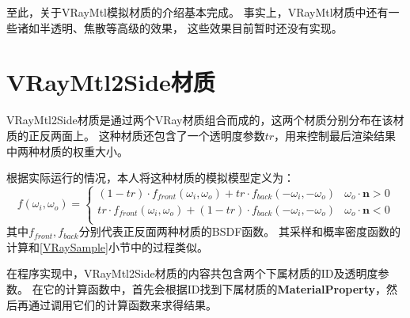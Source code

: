 至此，关于VRayMtl模拟材质的介绍基本完成。
事实上，VRayMtl材质中还有一些诸如半透明、焦散等高级的效果，
这些效果目前暂时还没有实现。

\section{VRayMtl2Side材质}

VRayMtl2Side材质是通过两个VRay材质组合而成的，这两个材质分别分布在该材质的正反两面上。
这种材质还包含了一个透明度参数$tr$，用来控制最后渲染结果中两种材质的权重大小。

根据实际运行的情况，本人将这种材质的模拟模型定义为：
\begin{equation}
    f(\omega_i, \omega_o) = 
    \begin{cases}
    (1-tr)\cdot f_{front}(\omega_i, \omega_o)+tr\cdot f_{back}(-\omega_i, -\omega_o)& \omega_o \cdot \textbf{n} > 0\\
    tr\cdot f_{front}(\omega_i, \omega_o)+(1-tr)\cdot f_{back}(-\omega_i, -\omega_o)& \omega_o \cdot \textbf{n} < 0\\
    \end{cases}
\end{equation}
其中$f_{front},f_{back}$分别代表正反面两种材质的BSDF函数。
其采样和概率密度函数的计算和\ref{VRaySample}小节中的过程类似。

在程序实现中，VRayMtl2Side材质的内容共包含两个下属材质的ID及透明度参数。
在它的计算函数中，首先会根据ID找到下属材质的\textbf{MaterialProperty}，然后再通过调用它们的计算函数来求得结果。

